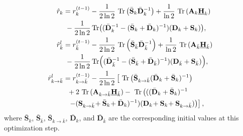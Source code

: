 \documentclass[a4, conference]{IEEEtran}
\theoremstyle{definition}
\begin{document}
\begin{align}
\nonumber
\hat{r}_{k}&=r_{k}^{(t-1)}
-\frac{1}{2\ln 2}\text{{ Tr}}\left(
\bar{\mathbf{S}}_{k}\bar{\mathbf{D}}_{k}^{-1}
\right)
+
\frac{1}{\ln 2}
\text{{ Tr}}\left(
{\mathbf{A}_{k}}
\underline{{\bf H}}_{k}%
\right)
\\
&\hspace{.1cm}-
\frac{1}{2\ln 2}\!
\text{{ Tr}}\!
\left(
(\bar{\mathbf{D}}^{-1}_{k}-(\bar{\mathbf{S}}_{k}+ \bar{\mathbf{D}}_{k})^{-1})
(\mathbf{D}_{k}+\mathbf{S}_{k})
\right)\!
,
\\
\nonumber
\hat{r}_{\bar{k}}^l&=r_{\bar{k}}^{(t-1)}
-\frac{1}{2\ln 2}\text{{ Tr}}\left(
\bar{\mathbf{S}}_{\bar{k}}\bar{\mathbf{D}}_{\bar{k}}^{-1}
\right)
+
\frac{1}{\ln 2}
\text{{ Tr}}\left(
{\mathbf{A}_{\bar{k}}}
\underline{{\bf H}}_{\bar{k}}%
\right)
\\
&\hspace{.1cm}-
\frac{1}{2\ln 2}\!
\text{{ Tr}}\!
\left(
(\bar{\mathbf{D}}^{-1}_{\bar{k}}-(\bar{\mathbf{S}}_{\bar{k}}+ \bar{\mathbf{D}}_{\bar{k}})^{-1})
(\mathbf{D}_{\bar{k}}+\mathbf{S}_{\bar{k}})
\right)
\!
,
\\
\nonumber
\hat{r}_{k\rightarrow\bar{k}}^l&=r_{k\rightarrow\bar{k}}^{(t-1)}
-\frac{1}{2\ln 2}\left[
\text{{ Tr}}\left(
\bar{{\bf S}}_{k\rightarrow\bar{k}}(\bar{\mathbf{D}}_{{k}}+\bar{\mathbf{S}}_{{k}})^{-1}
\right)
\right.
\\
&\nonumber
\hspace{.2cm}
+
2
\text{{ Tr}}\left(
{\mathbf{A}_{k\rightarrow\bar{k}}}
\underline{{\bf H}}_{\bar{k}}%
\right)
-
\text{{ Tr}}\left(
((\bar{\mathbf{D}}_{{k}}+\bar{\mathbf{S}}_{{k}})^{-1}
\right.
\\
&\hspace{.2cm}
\left.\left.
-({\bf S}_{k\rightarrow\bar{k}}\!
+\bar{\mathbf{S}}_{{k}}\!
+ \bar{\mathbf{D}}_{{k}})^{-1})
(\mathbf{D}_{{k}}\!+\mathbf{S}_{{k}}\!+{\bf S}_{k\rightarrow\bar{k}})
\right)
\right],
\end{align}
where $\bar{\mathbf{S}}_{k}$, $\bar{\mathbf{S}}_{\bar{k}}$, $\bar{\mathbf{S}}_{k\rightarrow\bar{k}}$, 
$\bar{\mathbf{D}}_{k}$, and $\bar{\mathbf{D}}_{\bar{k}}$ are the corresponding initial values at this optimization step. 
\end{document}
